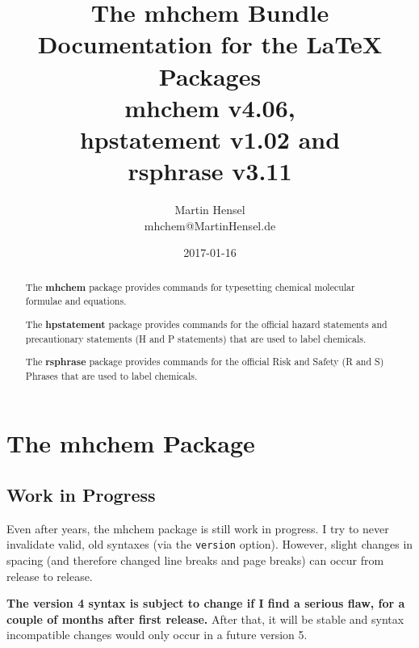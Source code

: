 \documentclass[a4paper,notitlepage,parskip=half]{scrreprt}
\begin{document}
\title{%
  The mhchem Bundle\\[0.3em]
  \Large\textmd{%
    Documentation for the \LaTeX{} Packages\\
    mhchem v4.06,\\%
    hpstatement v1.02 and\\
    rsphrase v3.11}%
}
\author{%
  Martin Hensel\\
  mhchem\makebox[0pt][l]{\textcolor{white}{NOSPAM}}@MartinHensel\makebox[1pt][l]{\textcolor{white}{.}}.de%
}
\date{%
  2017-01-16%
}
\maketitle

\vfill

\begin{abstract}
  \noindent
  The \textbf{mhchem} package provides commands for typesetting chemical molecular formulae and equations.

  \medskip
  \noindent The \textbf{hpstatement} package provides commands for the official hazard statements and precautionary statements (H and P statements) that are used to label chemicals.

  \medskip
  \noindent
  The \textbf{rsphrase} package provides commands for the official Risk and Safety (R and S) Phrases that are used to label chemicals.
\end{abstract}



\clearpage
\tableofcontents



\clearpage
\chapter{The mhchem Package}


\section{Work in Progress}

Even after years, the mhchem package is still work in progress. I try to never invalidate valid, old syntaxes (via the \verb|version| option). However, slight changes in spacing (and therefore changed line breaks and page breaks) can occur from release to release.

\textbf{The version 4 syntax is subject to change if I find a serious flaw, for a couple of months after first release.} After that, it will be stable and  syntax incompatible changes would only occur in a future version 5.
\end{document}
